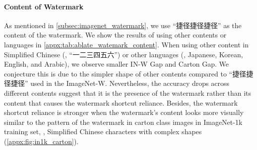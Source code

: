 \documentclass[10pt,twocolumn,letterpaper]{article}
\begin{document}
\begin{CJK*}{UTF8}{gbsn}
\paragraph{Content of Watermark} As mentioned in \cref{subsec:imagenet_watermark}, we use ``捷径捷径捷径'' as the content of the watermark. We show the results of using other contents or languages in \cref{appx:tab:ablate_watemark_content}. When using other content in Simplified Chinese (\eg, ``一二三四五六'') or other languages (\ie, Japanese, Korean, English, and Arabic), we observe smaller IN-W Gap and Carton Gap. We conjecture this is due to the simpler shape of other contents compared to ``捷径捷径捷径'' used in the ImageNet-W. Nevertheless, the accuracy drops across different contents suggest that it is the presence of the watermark rather than its content that causes the watermark shortcut reliance. Besides, the watermark shortcut reliance is stronger when the watermark's content looks more visually similar to the pattern of the watermark in carton class images in ImageNet-1k training set, \eg, Simplified Chinese characters with complex shapes (\cf \cref{appx:fig:in1k_carton}).
\end{CJK*}
\end{document}
